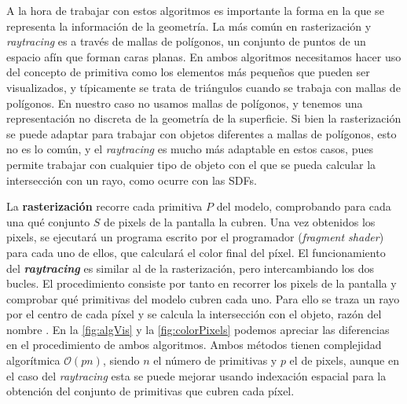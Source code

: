 A la hora de trabajar con estos algoritmos es importante la forma en la que se representa la información de la geometría. La más común en rasterización y \textit{raytracing} es a través de mallas de polígonos, un conjunto de puntos de un espacio afín que forman caras planas. En ambos algoritmos necesitamos hacer uso del concepto de primitiva como los elementos más pequeños que pueden ser visualizados, y típicamente se trata de triángulos cuando se trabaja con mallas de polígonos. En nuestro caso no usamos mallas de polígonos, y tenemos una representación no discreta de la geometría de la superficie. Si bien la rasterización se puede adaptar para trabajar con objetos diferentes a mallas de polígonos, esto no es lo común, y el \textit{raytracing} es mucho más adaptable en estos casos, pues permite trabajar con cualquier tipo de objeto con el que se pueda calcular la intersección con un rayo, como ocurre con las SDFs.\newline

La \textbf{rasterización} recorre cada primitiva $P$ del modelo, comprobando para cada una qué conjunto $S$ de pixels de la pantalla la cubren. Una vez obtenidos los pixels, se ejecutará un programa escrito por el programador (\textit{fragment shader}) para cada uno de ellos, que calculará el color final del píxel. El funcionamiento del \textbf{\textit{raytracing}} es similar al de la rasterización, pero intercambiando los dos bucles. El procedimiento consiste por tanto en recorrer los pixels de la pantalla y comprobar qué primitivas del modelo cubren cada uno. Para ello se traza un rayo por el centro de cada píxel y se calcula la intersección con el objeto, razón del nombre . En la \autoref{fig:algVis} y la \autoref{fig:colorPixels} podemos apreciar las diferencias en el procedimiento de ambos algoritmos. Ambos métodos tienen complejidad algorítmica $\mathcal{O}(pn)$, siendo $n$ el número de primitivas y $p$ el de pixels, aunque en el caso del \textit{raytracing} esta se puede mejorar usando indexación espacial para la obtención del conjunto de primitivas que cubren cada píxel.\newline

